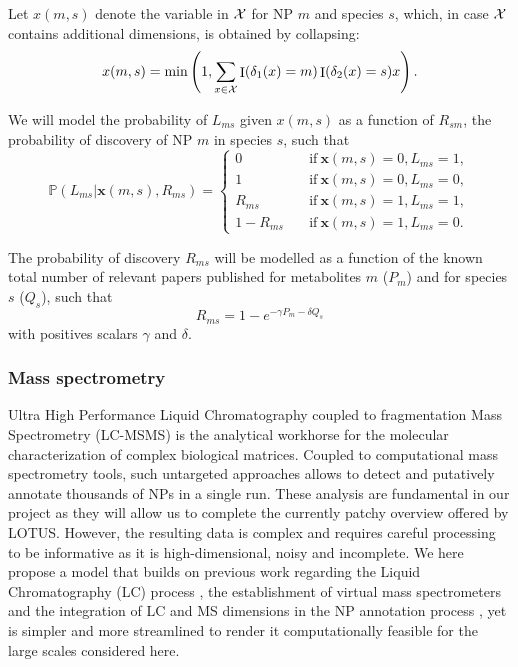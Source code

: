 \documentclass[
11pt, %
oneside, %
english, %
singlespacing, %
headsepline, %
chapterinoneline, %
]{MastersDoctoralThesis} %
\DeclareMathOperator{\Ind}{I}
\def\P{\mathbb{P}}
\def\x{\boldsymbol{x}}
\def\X{{\cal X}}
\begin{document}
Let $x(m,s)$ denote the variable in $\X$ for NP $m$ and species $s$, which, in case $\X$ contains additional dimensions, is obtained by collapsing:
\begin{equation}
	x(m,s) = \min \left(1, \sum_{x \in \X} \Ind(\delta_1(x)=m) \Ind(\delta_2(x)=s) x \right).
\end{equation}

We will model the probability of $L_{ms}$ given $x(m,s)$ as a function of $R_{sm}$, the probability of discovery of NP $m$ in species $s$, such that
\begin{equation}
	\P(L_{ms}|\x(m,s), R_{ms}) =
	\begin{cases}
		0 \quad &\mathrm{if\ } \x(m,s)=0, L_{ms} = 1,\\
		1 \quad &\mathrm{if\ } \x(m,s)=0, L_{ms} = 0,\\
		R_{ms} \quad &\mathrm{if\ } \x(m,s)=1, L_{ms} = 1,\\
		1- R_{ms} \quad &\mathrm{if\ } \x(m,s)=1, L_{ms} = 0.
	\end{cases}
\end{equation}

The probability of discovery $R_{ms}$ will be modelled as a function of the known total number of relevant papers published for metabolites $m$ ($P_m$) and for species $s$ ($Q_s$), such that
\begin{equation}
	R_{ms} = 1 - e^{-\gamma P_m - \delta Q_s}
\end{equation}
with positives scalars $\gamma$ and $\delta$.

\subsubsection{Mass spectrometry}
Ultra High Performance Liquid Chromatography coupled to fragmentation Mass Spectrometry (LC-MSMS) is the analytical workhorse for the molecular characterization of complex biological matrices. Coupled to computational mass spectrometry tools, such untargeted approaches allows to detect and putatively annotate thousands of NPs in a single run. These analysis are fundamental in our project as they will allow us to complete the currently patchy overview offered by LOTUS. However, the resulting data is complex and requires careful processing to be informative as it is high-dimensional, noisy and incomplete. We here propose a model that builds on previous work regarding the Liquid Chromatography (LC) process \cite{heymannAdvancedErrorModeling2023, wiczlingApplicationBayesianMultilevel2021}, the establishment of virtual mass spectrometers \cite{wandySilicoOptimizationMass2019, wandyViMMSFrameworkDevelop2022,wandySimulatedtorealBenchmarkingAcquisition2023} and the integration of LC and MS dimensions in the NP annotation process \cite{bachProbabilisticFrameworkIntegration2021, bachJointStructuralAnnotation2022}, yet is simpler and more streamlined to render it computationally feasible for the large scales considered here.
\end{document}
